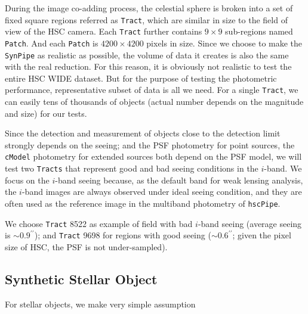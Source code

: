 \documentclass{pasj01}
\def\arcsec{{\prime\prime}}
\begin{document}
    During the image co-adding process, the celestial sphere is broken into a set 
    of fixed square regions referred as \texttt{Tract}, which are similar in size 
    to the field of view of the HSC camera. 
    Each \texttt{Tract} further contains $9\times9$ sub-regions named \texttt{Patch}. 
    And each \texttt{Patch} is $4200\times4200$ pixels in size. 
    Since we choose to make the \texttt{SynPipe} as realistic as possible, the volume 
    of data it creates is also the same with the real reduction.  
    For this reason, it is obviously not realistic to test the entire HSC WIDE 
    dataset.  
    But for the purpose of testing the photometric performance, representative subset
    of data is all we need. 
    For a single \texttt{Tract}, we can easily tens of thousands of objects 
    (actual number depends on the magnitude and size) for our tests.  
    
    Since the detection and measurement of objects close to the detection limit 
    strongly depends on the seeing; and the PSF photometry for point sources,  
    the \texttt{cModel} photometry for extended sources both depend on the PSF 
    model, we will test two \texttt{Tracts} that represent good and bad seeing 
    conditions in the $i$-band.  
    We focus on the $i$-band seeing because, as the default band for weak lensing 
    analysis, the $i$-band images are always observed under ideal seeing condition,
    and they are often used as the reference image in the multiband photometry of 
    \texttt{hscPipe}. 
    
    We choose \texttt{Tract} 8522 as example of field with bad $i$-band seeing 
    (average seeing is $\sim 0.9^{\arcsec}$); and \texttt{Tract} 9698 for regions 
    with good seeing ($\sim 0.6^{\arcsec}$; given the pixel size of HSC, the PSF 
    is not under-sampled).  
         
\subsection{Synthetic Stellar Object}
    
    For stellar objects, we make very simple assumption
\end{document}
